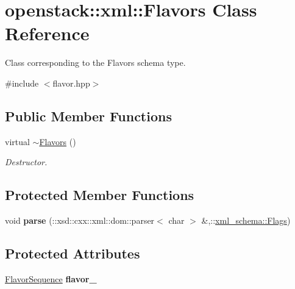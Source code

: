 \hypertarget{classopenstack_1_1xml_1_1Flavors}{
\section{openstack::xml::Flavors Class Reference}
\label{classopenstack_1_1xml_1_1Flavors}
}


Class corresponding to the Flavors schema type.  




{\ttfamily \#include $<$flavor.hpp$>$}

\subsection*{Public Member Functions}
\begin{DoxyCompactItemize}
\item 
\hypertarget{classopenstack_1_1xml_1_1Flavors_a9bd1fbb8527c82468ed661a6274dd74e}{
virtual \hyperlink{classopenstack_1_1xml_1_1Flavors_a9bd1fbb8527c82468ed661a6274dd74e}{$\sim$Flavors} ()}
\label{classopenstack_1_1xml_1_1Flavors_a9bd1fbb8527c82468ed661a6274dd74e}

\begin{DoxyCompactList}\small\item\em Destructor. \item\end{DoxyCompactList}\end{DoxyCompactItemize}
\subsection*{Protected Member Functions}
\begin{DoxyCompactItemize}
\item 
\hypertarget{classopenstack_1_1xml_1_1Flavors_a458b9a300a83c9b9c278a60f383e42aa}{
void {\bfseries parse} (::xsd::cxx::xml::dom::parser$<$ char $>$ \&,::\hyperlink{namespacexml__schema_affb4c227cbd9aa7453dd1dc5a1401943}{xml\_\-schema::Flags})}
\label{classopenstack_1_1xml_1_1Flavors_a458b9a300a83c9b9c278a60f383e42aa}

\end{DoxyCompactItemize}
\subsection*{Protected Attributes}
\begin{DoxyCompactItemize}
\item 
\hypertarget{classopenstack_1_1xml_1_1Flavors_a459f0d24e13728bd0908e8b91ffedd88}{
\hyperlink{classopenstack_1_1xml_1_1Flavors_a6dcb5da00dc0310b0bae660aa5d40409}{FlavorSequence} {\bfseries flavor\_\-}}
\label{classopenstack_1_1xml_1_1Flavors_a459f0d24e13728bd0908e8b91ffedd88}

\end{DoxyCompactItemize}
